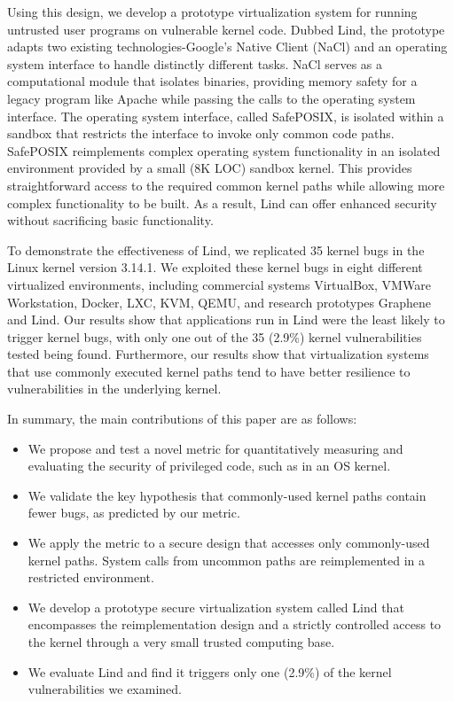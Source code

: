 Using this design, we develop a prototype virtualization system for
running untrusted user programs on vulnerable kernel code. Dubbed Lind, the
prototype adapts two existing technologies-Google's Native Client (NaCl) and
an operating system interface
to handle distinctly different tasks. NaCl serves as a computational
module that isolates binaries, providing memory safety for a legacy program like
Apache while passing the calls to the operating system interface.
The operating system interface, called SafePOSIX,
is isolated within a sandbox that restricts the interface to invoke only common code paths.
SafePOSIX reimplements complex operating system functionality in an isolated
environment provided by a small (8K LOC) sandbox kernel. This provides
straightforward access to the required common kernel paths while allowing more
complex functionality to be built.
As a result, Lind can offer enhanced security without sacrificing basic functionality.

To demonstrate the effectiveness of Lind, we replicated 35 kernel bugs in the Linux kernel
version 3.14.1. We exploited these kernel bugs %
in eight different virtualized environments, including
commercial systems VirtualBox, VMWare Workstation, Docker, LXC,
KVM, QEMU, and research prototypes Graphene and Lind. Our results show
that applications run in Lind were the least likely to trigger kernel bugs,
with only one out of the 35 (2.9\%) kernel vulnerabilities tested being found.
Furthermore, our results show that virtualization systems that use commonly
executed kernel paths tend to have better resilience to vulnerabilities
in the underlying kernel.  

In summary, the main contributions of this paper are as follows:

\begin{itemize}\setlength\itemsep{0em}
\item
We propose and test a novel metric for quantitatively measuring and evaluating
the security of privileged code, such as in an OS kernel.

\item
We validate the key hypothesis that commonly-used kernel paths contain fewer bugs,
as predicted by our metric.

\item
We apply the metric to a secure design that accesses only commonly-used
kernel paths. System calls from uncommon paths are reimplemented in a
restricted environment.

\item
We develop a prototype secure virtualization system called Lind that encompasses
the reimplementation design and a strictly controlled access to the kernel
through a very small trusted computing base.

\item
We evaluate Lind and find it triggers only one (2.9\%) of the kernel vulnerabilities
we examined.
\end{itemize}

